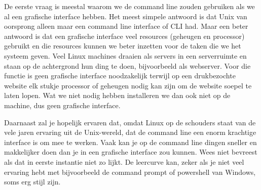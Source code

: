 De eerste vraag is meestal waarom we de command line zouden gebruiken als we al een grafische interface hebben. Het
meest simpele antwoord is dat Unix van oorsprong alleen maar een command line interface of CLI had. Maar een beter
antwoord is dat een grafische interface veel resources (geheugen en processor) gebruikt en die resources kunnen we
beter inzetten voor de taken die we het systeem geven. Veel Linux machines draaien als servers in een serverruimte en
staan op de achtergrond hun ding te doen, bijvoorbeeld als webserver. Voor die functie is geen grafische interface
noodzakelijk terwijl op een drukbezochte website elk stukje processor of geheugen nodig kan zijn om de website soepel
te laten lopen. Wat we niet nodig hebben installeren we dan ook niet op de machine, dus geen grafische interface.

Daarnaast zal je hopelijk ervaren dat, omdat Linux op de schouders staat van de vele jaren ervaring uit de Unix-wereld,
dat de command line een enorm krachtige interface is om mee te werken. Vaak kan je op de command line dingen sneller en
makkelijker doen dan je in een grafische interface zou kunnen. Wees niet bevreest als dat in eerste instantie niet zo
lijkt. De leercurve kan, zeker als je niet veel ervaring hebt met bijvoorbeeld de command prompt of powershell van Windows, soms erg stijl zijn.

